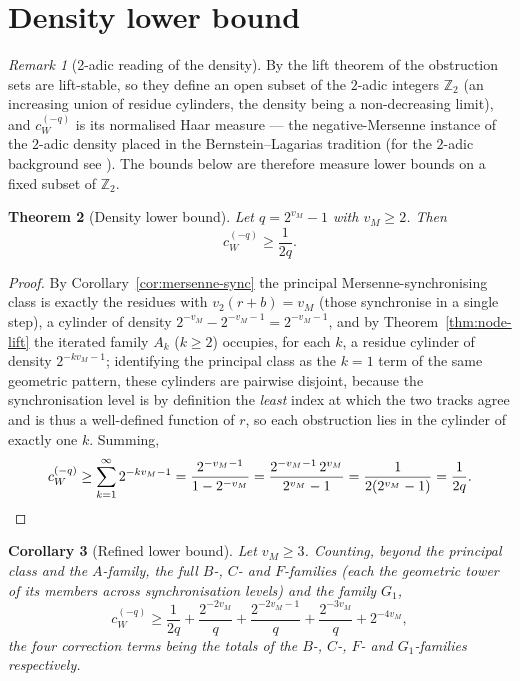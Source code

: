 \documentclass[11pt,reqno]{amsart}
\theoremstyle{plain}
\newtheorem{theorem}{Theorem}[section]
\newtheorem{corollary}[theorem]{Corollary}
\theoremstyle{definition}
\theoremstyle{remark}
\newtheorem{remark}[theorem]{Remark}
\newcommand{\Ztwo}{\mathbb{Z}_{2}}
\newcommand{\vtwo}{v_{2}}
\newcommand{\vM}{v_{M}}
\newcommand{\cWq}{c_{W}^{(-q)}}
\begin{document}
\section{Density lower bound}\label{sec:density}

\begin{remark}[2-adic reading of the density]\label{rem:haar}
By the lift theorem of \cite{ObstructionResiduesFamily2026} the obstruction
sets are lift-stable, so they define an open subset of the $2$-adic integers
$\Ztwo$ (an increasing union of residue cylinders, the density being a
non-decreasing limit), and $\cWq$ is its normalised Haar measure --- the negative-Mersenne
instance of the $2$-adic density placed in the Bernstein--Lagarias tradition
\cite{BernsteinLagarias1996} (for the $2$-adic background see
\cite{Robert2000}). The bounds below are therefore measure lower bounds on a
fixed subset of $\Ztwo$.
\end{remark}

\begin{theorem}[Density lower bound]\label{thm:atom-density}
Let $q = 2^{\vM} - 1$ with $\vM \ge 2$. Then
\[
\cWq \ge \frac{1}{2q}.
\]
\end{theorem}

\begin{proof}
By Corollary~\ref{cor:mersenne-sync} the principal Mersenne-synchronising
class is exactly the residues with $\vtwo(r + b) = \vM$ (those synchronise in a
single step), a cylinder of density $2^{-\vM} - 2^{-\vM - 1} = 2^{-\vM - 1}$,
and by
Theorem~\ref{thm:node-lift} the iterated family $A_k$ ($k \ge 2$) occupies,
for each $k$, a residue cylinder of density $2^{-k\vM - 1}$; identifying the
principal class as the $k = 1$ term of the same geometric pattern, these
cylinders are pairwise disjoint, because the synchronisation level is by
definition the \emph{least} index at which the two tracks agree and is thus a
well-defined function of $r$, so each obstruction lies in the cylinder of
exactly one $k$. Summing,
\[
\cWq \ge \sum_{k = 1}^{\infty} 2^{-k\vM - 1}
      = \frac{2^{-\vM - 1}}{1 - 2^{-\vM}}
      = \frac{2^{-\vM - 1}\, 2^{\vM}}{2^{\vM} - 1}
      = \frac{1}{2(2^{\vM} - 1)}
      = \frac{1}{2q}. \qedhere
\]
\end{proof}

\begin{corollary}[Refined lower bound]\label{cor:atom-density-extended}
Let $\vM \ge 3$. Counting, beyond the principal class and the $A$-family,
the full $B$-, $C$-
and $F$-families (each the geometric tower of its members across
synchronisation levels) and the family $G_1$,
\[
\cWq \ge \frac{1}{2q}
       + \frac{2^{-2\vM}}{q}
       + \frac{2^{-2\vM - 1}}{q}
       + \frac{2^{-3\vM}}{q}
       + 2^{-4\vM},
\]
the four correction terms being the totals of the $B$-, $C$-, $F$- and
$G_1$-families respectively.
\end{corollary}
\end{document}
